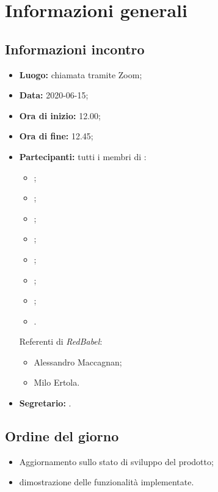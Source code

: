 \section{Informazioni generali}
\subsection{Informazioni incontro}
\begin{itemize}
	\item \textbf{Luogo:} chiamata tramite Zoom;
	\item \textbf{Data:} 2020-06-15;
	\item \textbf{Ora di inizio:} 12.00;
	\item \textbf{Ora di fine:} 12.45;
	\item \textbf{Partecipanti:}
		tutti i membri di \Gruppo:
		\begin{itemize}
			\item \VB;
			\item \LB;
			\item \NF;
			\item \EG;
			\item \FJ;
			\item \MP;
			\item \AS;
			\item \AZ.
		\end{itemize}
		
		Referenti di \textit{RedBabel}:
		\begin{itemize}
			\item Alessandro Maccagnan;
			\item Milo Ertola.
		\end{itemize}
	\item \textbf{Segretario:} \EG.
\end{itemize}

\subsection{Ordine del giorno}
\begin{itemize}
	\item Aggiornamento sullo stato di sviluppo del prodotto\textit{}; 
	\item dimostrazione delle funzionalità implementate. 
\end{itemize}
